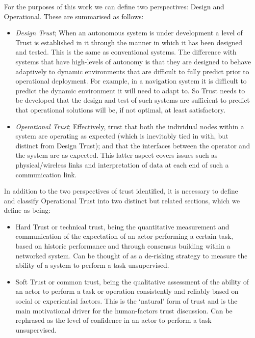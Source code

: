 \documentclass[runningheads,a4paper]{llncs}
\begin{document}
For the purposes of this work we can define two perspectives: Design and Operational. These are summarised as follows:

\begin{itemize}
  \item \emph{Design Trust}; When an autonomous system is under development a level of Trust is established in it through the manner in which it has been designed and tested. This is the same as conventional systems. The difference with systems that have high-levels of autonomy is that they are designed to behave adaptively to dynamic environments that are difficult to fully predict prior to operational deployment. For example, in a navigation system it is difficult to predict the dynamic environment it will need to adapt to. So Trust needs to be developed that the design and test of such systems are sufficient to predict that operational solutions will be, if not optimal, at least satisfactory.

  \item \emph{Operational Trust}; Effectively, trust that both the individual nodes within a system are operating as expected (which is inevitably tied in with, but distinct from Design Trust); and that the interfaces between the operator and the system are as expected. This latter aspect covers issues such as physical/wireless links and interpretation of data at each end of such a communication link.
\end{itemize}

In addition to the two perspectives of trust identified, it is necessary to define and classify Operational Trust into two distinct but related sections, which we define as being:
\begin{itemize}
  \item Hard Trust or technical trust, being the quantitative measurement and communication of the expectation of an actor performing a certain task, based on historic performance and through consensus building within a networked system. Can be thought of as a de-risking strategy to measure the ability of a system to perform a task unsupervised.
  \item Soft Trust or common trust, being the qualitative assessment of the ability of an actor to perform a task or operation consistently and reliably based on social or experiential factors. This is the ‘natural’ form of trust and is the main motivational driver for the human-factors trust discussion. Can be rephrased as the level of confidence in an actor to perform a task unsupervised.
\end{itemize} 
\end{document}
